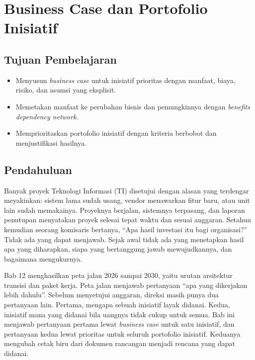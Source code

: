 \chapter{Business Case dan Portofolio Inisiatif}
\label{ch:ch13-business-case}


\section*{Tujuan Pembelajaran}
\begin{itemize}
  \item Menyusun \textit{business case} untuk inisiatif prioritas dengan manfaat, biaya, risiko, dan asumsi yang eksplisit.
  \item Memetakan manfaat ke perubahan bisnis dan pemungkinnya dengan \textit{benefits dependency network}.
  \item Memprioritaskan portofolio inisiatif dengan kriteria berbobot dan menjustifikasi hasilnya.
\end{itemize}

\section{Pendahuluan}

Banyak proyek Teknologi Informasi (TI) disetujui dengan alasan yang terdengar
meyakinkan: sistem lama sudah usang, vendor menawarkan fitur baru, atau unit
lain sudah memakainya. Proyeknya berjalan, sistemnya terpasang, dan laporan
penutupan menyatakan proyek selesai tepat waktu dan sesuai anggaran. Setahun
kemudian seorang komisaris bertanya, ``Apa hasil investasi itu bagi
organisasi?'' Tidak ada yang dapat menjawab. Sejak awal tidak ada yang
menetapkan hasil apa yang diharapkan, siapa yang bertanggung jawab
mewujudkannya, dan bagaimana mengukurnya.

Bab 12 menghasilkan peta jalan 2026 sampai 2030, yaitu urutan arsitektur
transisi dan paket kerja. Peta jalan menjawab pertanyaan ``apa yang dikerjakan
lebih dahulu''. Sebelum menyetujui anggaran, direksi masih punya dua
pertanyaan lain. Pertama, mengapa sebuah inisiatif layak didanai. Kedua,
inisiatif mana yang didanai bila uangnya tidak cukup untuk semua. Bab ini
menjawab pertanyaan pertama lewat \textit{business case} untuk satu inisiatif,
dan pertanyaan kedua lewat prioritas untuk seluruh portofolio inisiatif.
Keduanya mengubah cetak biru dari dokumen rancangan menjadi rencana yang dapat
didanai.

